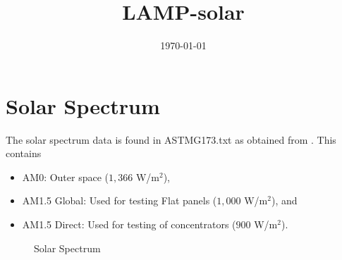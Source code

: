 \documentclass[12pt]{article}
\date{\today }
\title{LAMP-solar}
\begin{document}
\setcounter{page}{1}

\maketitle
{}
\pagestyle{empty}

\tableofcontents
\newpage
\listoffigures
{}

\newpage
\pagestyle{plain}
\setcounter{page}{1}

\section{Solar Spectrum}

The solar spectrum data is found in ASTMG173.txt as obtained from \cite{SolarAM15}.
This contains 
\begin{itemize}
\item AM0: Outer space ($1,366$ W/m$^2$),
\item AM1.5 Global: Used for testing Flat panels ($1,000$ W/m$^2$), and 
\item AM1.5 Direct: Used for testing of concentrators ($900$ W/m$^2$).
\end{itemize}

\begin{figure}[H]
\centering
\vspace{-10pt}
 \hspace{5pt}
 \caption[Solar Spectrum]{Solar Spectrum}
  \label{fig:SolarSpectrum}
\end{figure}
\end{document}
